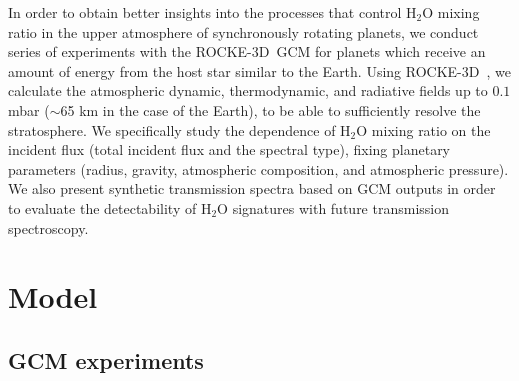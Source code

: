 \documentclass[11pt,numberedappendix,twocolappendix,]{emulateapj}
\def\water{H$_2$O }
\def\modelE{ROCKE-3D}
\def\memo#1{\color{red}$[${\bf #1}$]$ \color{black}}
\begin{document}

In order to obtain better insights into the processes that control \water mixing ratio in the upper atmosphere of synchronously rotating planets, we conduct series of experiments with the \modelE \ GCM for planets which receive an amount of energy from the host star similar to the Earth. 
Using \modelE \ , we calculate the atmospheric dynamic, thermodynamic, and radiative fields up to $0.1$ mbar ($\sim $65 km in the case of the Earth), to be able to sufficiently resolve the stratosphere. 
We specifically study the dependence of \water mixing ratio on the incident flux (total incident flux and the spectral type), fixing planetary parameters (radius, gravity, atmospheric composition, and atmospheric pressure). 
We also present synthetic transmission spectra based on GCM outputs in order to evaluate the detectability of \water signatures with future transmission spectroscopy. 




\section{Model}
\label{s:model}

\subsection{GCM experiments}
\end{document}
